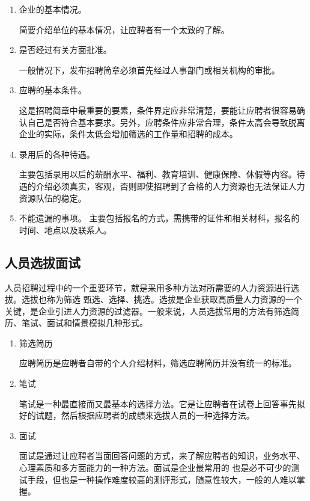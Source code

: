     \begin{enumerate}
        \item 企业的基本情况。

        简要介绍单位的基本情况，让应聘者有一个太致的了解。

        \item 是否经过有关方面批准。

        一般情况下，发布招聘简章必须首先经过人事部门或相关机构的审批。

        \item 应聘的基本条件。

        这是招聘简章中最重要的要素，条件界定应非常清楚，要能让应聘者很容易确认自己是否符合基本要求。另外，应聘条件应非常合理，条件太高会导致脱离企业的实际，条件太低会增加筛选的工作量和招聘的成本。

        \item 录用后的各种待遇。

        主要包括录用以后的薪酬水平、福利、教育培训、健康保障、休假等内容。待遇的介绍必须真实，客观，否则即使招聘到了合格的人力资源也无法保证人力资源队伍的稳定。

        \item 不能遗漏的事项。
        主要包括报名的方式，需携带的证件和相关材科，报名的时间、地点以及联系人。
    \end{enumerate}

\subsection {人员选拔面试}

    人员招聘过程中的一个重要环节，就是采用多种方法对所需要的人力资源进行选拔。选拔也称为筛选 甄选、选择、挑选。选拔是企业获取高质量人力资源的一个关键，是企业引进人力资源的过滤器。一般来说，人员选拔常用的方法有筛选简历、笔试、面试和情景模拟几种形式。

    \begin{enumerate}
        \item 筛选简历

        应聘简历是应聘者自带的个人介绍材料，筛选应聘简历并没有统一的标准。

        \item  笔试

        笔试是一种最直接而又最基本的选择方法。它是让应聘者在试卷上回答事先拟好的试题，然后根据应聘者的成绩来选拔人员的一种选择方法。

        \item  面试

        面试是通过让应聘者当面回答问题的方式，来了解应聘者的知识，业务水平、心理素质和多方面能力的一种方法。面试是企业最常用的 也是必不可少的测试手段，但也是一种操作难度较高的测评形式，随意性较大，一般的人难以掌握。
    \end{enumerate}

